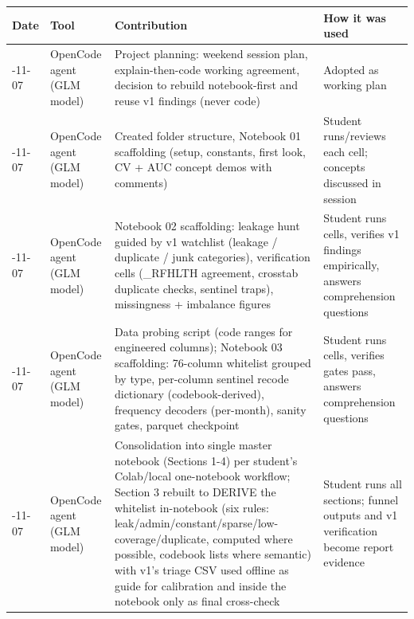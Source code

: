 \documentclass[11pt,a4paper]{article}
\begin{document}
{{\def\LTcaptype{none} %
\begin{longtable}[]{@{}
  >{\raggedright\arraybackslash}p{}
  >{\raggedright\arraybackslash}p{}
  >{\raggedright\arraybackslash}p{}
  >{\raggedright\arraybackslash}p{}@{}}
\toprule\noalign{}
\begin{minipage}[b]{\linewidth}\raggedright
Date
\end{minipage} & \begin{minipage}[b]{\linewidth}\raggedright
Tool
\end{minipage} & \begin{minipage}[b]{\linewidth}\raggedright
Contribution
\end{minipage} & \begin{minipage}[b]{\linewidth}\raggedright
How it was used
\end{minipage} \\
\midrule\noalign{}
\endhead
\bottomrule\noalign{}
\endlastfoot
2026-11-07 & OpenCode agent (GLM model) & Project planning: weekend session plan, explain-then-code working agreement, decision to rebuild notebook-first and reuse v1 findings (never code) & Adopted as working plan \\
2026-11-07 & OpenCode agent (GLM model) & Created folder structure, Notebook 01 scaffolding (setup, constants, first look, CV + AUC concept demos with comments) & Student runs/reviews each cell; concepts discussed in session \\
2026-11-07 & OpenCode agent (GLM model) & Notebook 02 scaffolding: leakage hunt guided by v1 watchlist (leakage / duplicate / junk categories), verification cells (\_RFHLTH agreement, crosstab duplicate checks, sentinel traps), missingness + imbalance figures & Student runs cells, verifies v1 findings empirically, answers comprehension questions \\
2026-11-07 & OpenCode agent (GLM model) & Data probing script (code ranges for engineered columns); Notebook 03 scaffolding: 76-column whitelist grouped by type, per-column sentinel recode dictionary (codebook-derived), frequency decoders (per-month), sanity gates, parquet checkpoint & Student runs cells, verifies gates pass, answers comprehension questions \\
2026-11-07 & OpenCode agent (GLM model) & Consolidation into single master notebook (Sections 1-4) per student's Colab/local one-notebook workflow; Section 3 rebuilt to DERIVE the whitelist in-notebook (six rules: leak/admin/constant/sparse/low-coverage/duplicate, computed where possible, codebook lists where semantic) with v1's triage CSV used offline as guide for calibration and inside the notebook only as final cross-check & Student runs all sections; funnel outputs and v1 verification become report evidence \\

\end{longtable}}}
\end{document}
